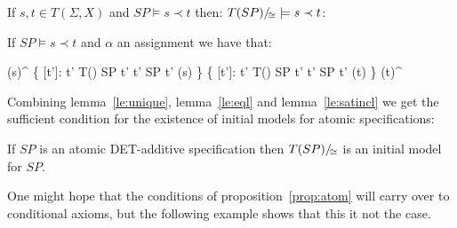 \documentclass[10pt]{article}
\begin{document}
\begin{lemma}
\label{le:satincl}
If $s,t \in T(\Sigma,X)$ and $SP \models s \prec t$ then: ${T(SP)/\!_{\cong}} \models s \prec t$:
\end{lemma}
%
\begin{PROOF}
If $SP\models s \prec t$ and $\alpha$ an assignment we have that:
	\begin{eqp}
		\alpha(s)^{}
		\{ [t']: t' \in T(\Sigma) \land SP \models t' \eleq t' \land SP \models t' \prec \alpha(s) \}
		\{ [t']: t' \in T(\Sigma) \land SP \models t' \eleq t' \land SP \models t' \prec \alpha(t) \}
		\alpha(t)^{}
	\end{eqp}\vspace*{-2ex}
\end{PROOF}
\newpage
Combining lemma~\ref{le:unique}, lemma~\ref{le:eql} and
lemma~\ref{le:satincl} we get the sufficient condition for the existence of
initial models for atomic specifications:

\begin{proposition}\label{prop:atom} \cite{hussmann}
\label{fa:atinit}
If $SP$ is an atomic DET-additive specification then ${T(SP)/\!_{\cong}}$ is
an initial model for $SP$.
\end{proposition}
One might hope that the conditions of proposition~\ref{prop:atom} will carry over to conditional axioms,
but the following example shows that this it not the case.
\end{document}
